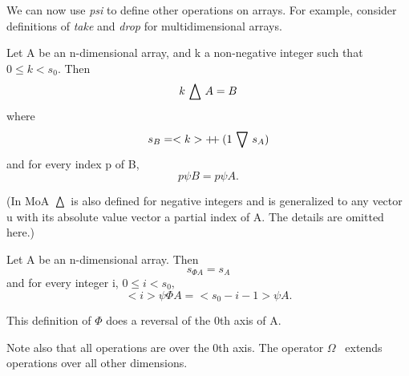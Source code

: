 We can now use {\em psi} to define other operations on arrays. 
For example, consider definitions of {\em take} and {\em drop} for multidimensional arrays.
\begin{definition}
Let A be an n-dimensional array, and k a non-negative integer
such that $0 \leq k < s_0$. Then
\[            k \,\bigtriangleup\, A = B \]
where
\[            s_B = <k> +\!\!\!+ (1 \,\bigtriangledown\, s_A) \]
and for every index p of B,
\[            p \psi B = p \psi A . \]

\end{definition}
(In MoA $\,\bigtriangleup\,$ is also defined for negative integers and is generalized to any vector u with its
absolute value vector a partial index of A. The details are omitted here.)
\begin{definition}
 Let A be an n-dimensional array. Then
\[             s_{\Phi A} = s_A \]
and for every integer i, $0 \leq i < s_0, $
\[             <i> \psi \Phi A = <s_0 - i - 1> \psi A. \]
\end{definition}
This definition of $\Phi$ does a reversal of the 0th axis of A. 

Note
also that all operations are over the 0th axis. The operator $\Omega$~\cite{mul88} extends operations over all other dimensions.
